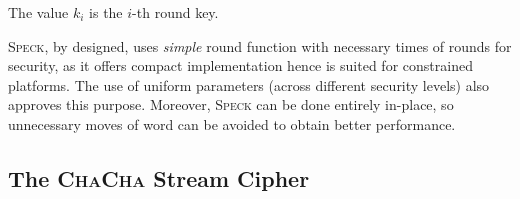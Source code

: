 \noindent The value $k_i$ is the $i$-th round key.

\textsc{Speck}, by designed, uses \textit{simple} round function with necessary times
of rounds for security, as it offers compact implementation hence is suited for
constrained platforms. The use of uniform parameters (across different security levels)
also approves this purpose. Moreover, \textsc{Speck} can be done entirely in-place, so
unnecessary moves of word can be avoided to obtain better performance.

\subsection{The \textbf{\textsc{ChaCha}} Stream Cipher}

\lipsum[3]
